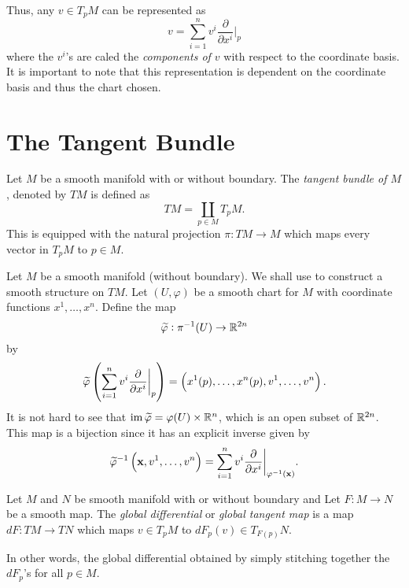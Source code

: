 Thus, any $v\in T_pM$ can be represented as 
\begin{equation*}
    v = \sum_{i = 1}^n v^i\frac{\partial }{\partial x^i}\bigg\vert_{p}
\end{equation*}
where the $v^i$'s are caled the \emph{components of $v$} with respect to the coordinate basis. It is important to note that this representation is dependent on the coordinate basis and thus the chart chosen.

\section{The Tangent Bundle}

\begin{definition}
    Let $M$ be a smooth manifold with or without boundary. The \emph{tangent bundle of $M$}, denoted by $TM$ is defined as 
    \begin{equation*}
        TM = \coprod_{p\in M} T_pM.
    \end{equation*}
    This is equipped with the natural projection $\pi: TM\to M$ which maps every vector in $T_pM$ to $p\in M$.
\end{definition}

\begin{mdframed}[frametitle={\centering $TM$ is a smooth $2n$-manifold}, frametitlerule=true, frametitlealignment=\centering]
    Let $M$ be a smooth manifold (without boundary). We shall use  to construct a smooth structure on $TM$. Let $(U,\varphi)$ be a smooth chart for $M$ with coordinate functions $x^1,\dots,x^n$. Define the map 
    \begin{equation*}
        \widetilde{\varphi}: \pi^{-1}(U)\to\mathbb{R}^{2n}
    \end{equation*}
    by 
    \begin{equation*}
        \widetilde{\varphi}\left(\sum_{i = 1}^n v^i\frac{\partial}{\partial x^i}\bigg\vert_p\right) = \left(x^1(p),\dots,x^n(p),v^1,\dots,v^n\right).
    \end{equation*}
    It is not hard to see that $\operatorname{im}\widetilde{\varphi} = \varphi(U)\times\mathbb{R}^n$, which is an open subset of $\mathbb{R}^{2n}$. This map is a bijection since it has an explicit inverse given by 
    \begin{equation*}
        \widetilde{\varphi}^{-1}\left(\mathbf x, v^1,\dots,v^n\right) = \sum_{i = 1}^n v^i\frac{\partial}{\partial x^i}\bigg\vert_{\varphi^{-1}(\mathbf x)}.
    \end{equation*}
\end{mdframed}

\begin{definition}
    Let $M$ and $N$ be smooth manifold with or without boundary and Let $F: M\to N$ be a smooth map. The \emph{global differential} or \emph{global tangent map} is a map $dF: TM\to TN$ which maps $v\in T_pM$ to $dF_p(v)\in T_{F(p)}N$.
\end{definition}

In other words, the global differential obtained by simply stitching together the $dF_p$'s for all $p\in M$.